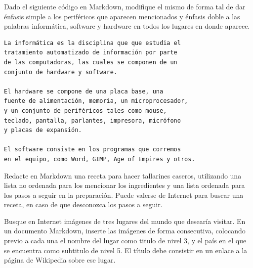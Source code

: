 \begin{exercise}
Dado el siguiente código en Markdown, modifique el mismo de forma tal de dar
énfasis simple a los periféricos que aparecen mencionados y énfasis doble a las
palabras informática, software y hardware en todos los lugares en donde aparece.

\begin{minipage}{0.92\textwidth}
    \begin{lstlisting}[language=Markdown]
La informática es la disciplina que que estudia el
tratamiento automatizado de información por parte
de las computadoras, las cuales se componen de un
conjunto de hardware y software.

El hardware se compone de una placa base, una
fuente de alimentación, memoria, un microprocesador,
y un conjunto de periféricos tales como mouse,
teclado, pantalla, parlantes, impresora, micrófono
y placas de expansión.

El software consiste en los programas que corremos
en el equipo, como Word, GIMP, Age of Empires y otros.
    \end{lstlisting}
\end{minipage}
\end{exercise}

\begin{exercise}
Redacte en Markdown una receta para hacer tallarines caseros, utilizando una
lista no ordenada para los mencionar los ingredientes y una lista ordenada para
los pasos a seguir en la preparación. Puede valerse de Internet para buscar una
receta, en caso de que desconozca los pasos a seguir.
\end{exercise}

\begin{exercise}
Busque en Internet imágenes de tres lugares del mundo que desearía visitar.
En un documento Markdown, inserte las imágenes de forma consecutiva, colocando
previo a cada una el nombre del lugar como titulo de nivel 3, y el país en el
que se encuentra como subtitulo de nivel 5. El título debe consistir en un enlace
a la página de Wikipedia sobre ese lugar.
\end{exercise}

